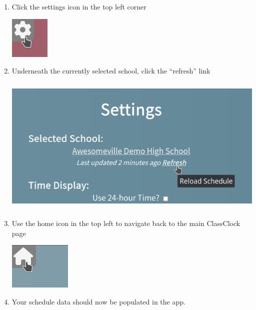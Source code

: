 \documentclass{article}
\begin{document}
\begin{enumerate}
\begin{center}
\end{center}
\item {Click the settings icon in the top left corner}
\begin{center}
\includegraphics[width=0.7398in,height=0.7917in]{images/settings-icon.png}
\end{center}
\item {Underneath the currently selected school, click the “refresh” link }
\begin{center}
\includegraphics[width=5.511in,height=2.6335in]{images/refreshing-schedule.png}
\end{center}
\item {Use the home icon in the top left to navigate back to the main ClassClock page}
\begin{center}
\includegraphics[width=1.1661in,height=0.8846in]{images/home-icon.png}
\end{center}
\item {Your schedule data should now be populated in the app.}
\begin{center}

\end{center}
\end{enumerate}
\end{document}
